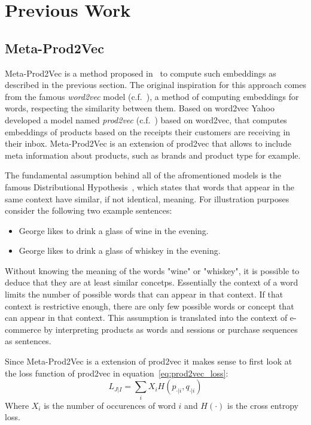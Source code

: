 \section{Previous Work}
\subsection{Meta-Prod2Vec}
Meta-Prod2Vec is a method proposed in~\cite{meta_prod2vec} to compute such embeddings as described in the previous section.
The original inspiration for this approach comes from the famous \emph{word2vec} model (c.f.~\cite{word2vec}), a method of computing embeddings for words, respecting the similarity between them.
Based on word2vec Yahoo developed a model named \emph{prod2vec} (c.f.~\cite{prod2vec}) based on word2vec, that computes embeddings of products based on the receipts their customers are receiving in their inbox.
Meta-Prod2Vec is an extension of prod2vec that allows to include meta information about products, such as brands and product type for example.
\par
The fundamental assumption behind all of the afromentioned models is the famous Distributional Hypothesis~\cite{distributional}, which states that words that appear in the same context have similar, if not identical, meaning.
For illustration purposes consider the following two example sentences:
\begin{itemize}
    \item George likes to drink a glass of wine in the evening.
    \item George likes to drink a glass of whiskey in the evening.
\end{itemize}
Without knowing the meaning of the words "wine" or "whiskey", it is possible to deduce that they are at least similar concetps.
Essentially the context of a word limits the number of possible words that can appear in that context.
If that context is restrictive enough, there are only few possible words or concept that can appear in that context.
This assumption is translated into the context of e-commerce by interpreting products as words and sessions or purchase sequences as sentences.
\par
Since Meta-Prod2Vec is a extension of prod2vec it makes sense to first look at the loss function of prod2vec in equation~\ref{eq:prod2vec_loss}:
\begin{equation}\label{eq:prod2vec_loss}
    L_{J|I} = \sum_i X_iH(p_{\cdot|i},q_{\cdot|i})
\end{equation}
Where $X_i$ is the number of occurences of word $i$ and $H(\cdot)$ is the cross entropy loss.
